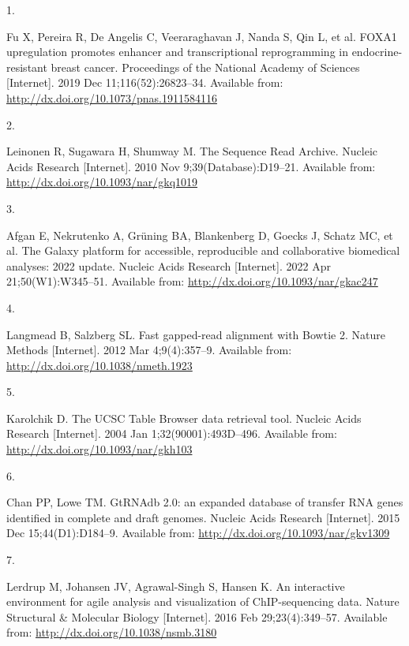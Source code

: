 \documentclass[
  12pt,
]{article}
\newlength{\cslhangindent}
\newlength{\csllabelwidth}
\newlength{\cslentryspacingunit} %
\newenvironment{CSLReferences}[2] %
 {%
  \setlength{\parindent}{0pt}
  \ifodd #1
  \let\oldpar\par
  \def\par{\hangindent=\cslhangindent\oldpar}
  \fi
  \setlength{\parskip}{#2\cslentryspacingunit}
 }%
 {}
\newcommand{\CSLLeftMargin}[1]{\parbox[t]{\csllabelwidth}{#1}}
\newcommand{\CSLRightInline}[1]{\parbox[t]{\linewidth - \csllabelwidth}{#1}\break}
\begin{document}
\hypertarget{refs}{}
\begin{CSLReferences}{0}{0}
\leavevmode{}%
\CSLLeftMargin{1. }%
\CSLRightInline{Fu X, Pereira R, De Angelis C, Veeraraghavan J, Nanda S, Qin L, et al. FOXA1 upregulation promotes enhancer and transcriptional reprogramming in endocrine-resistant breast cancer. Proceedings of the National Academy of Sciences {[}Internet{]}. 2019 Dec 11;116(52):26823--34. Available from: \url{http://dx.doi.org/10.1073/pnas.1911584116}}

\leavevmode{}%
\CSLLeftMargin{2. }%
\CSLRightInline{Leinonen R, Sugawara H, Shumway M. The Sequence Read Archive. Nucleic Acids Research {[}Internet{]}. 2010 Nov 9;39(Database):D19--21. Available from: \url{http://dx.doi.org/10.1093/nar/gkq1019}}

\leavevmode{}%
\CSLLeftMargin{3. }%
\CSLRightInline{Afgan E, Nekrutenko A, Grüning BA, Blankenberg D, Goecks J, Schatz MC, et al. The Galaxy platform for accessible, reproducible and collaborative biomedical analyses: 2022 update. Nucleic Acids Research {[}Internet{]}. 2022 Apr 21;50(W1):W345--51. Available from: \url{http://dx.doi.org/10.1093/nar/gkac247}}

\leavevmode{}%
\CSLLeftMargin{4. }%
\CSLRightInline{Langmead B, Salzberg SL. Fast gapped-read alignment with Bowtie 2. Nature Methods {[}Internet{]}. 2012 Mar 4;9(4):357--9. Available from: \url{http://dx.doi.org/10.1038/nmeth.1923}}

\leavevmode{}%
\CSLLeftMargin{5. }%
\CSLRightInline{Karolchik D. The UCSC Table Browser data retrieval tool. Nucleic Acids Research {[}Internet{]}. 2004 Jan 1;32(90001):493D--496. Available from: \url{http://dx.doi.org/10.1093/nar/gkh103}}

\leavevmode{}%
\CSLLeftMargin{6. }%
\CSLRightInline{Chan PP, Lowe TM. GtRNAdb 2.0: an expanded database of transfer RNA genes identified in complete and draft genomes. Nucleic Acids Research {[}Internet{]}. 2015 Dec 15;44(D1):D184--9. Available from: \url{http://dx.doi.org/10.1093/nar/gkv1309}}

\leavevmode{}%
\CSLLeftMargin{7. }%
\CSLRightInline{Lerdrup M, Johansen JV, Agrawal-Singh S, Hansen K. An interactive environment for agile analysis and visualization of ChIP-sequencing data. Nature Structural \& Molecular Biology {[}Internet{]}. 2016 Feb 29;23(4):349--57. Available from: \url{http://dx.doi.org/10.1038/nsmb.3180}}


\end{CSLReferences}
\end{document}
